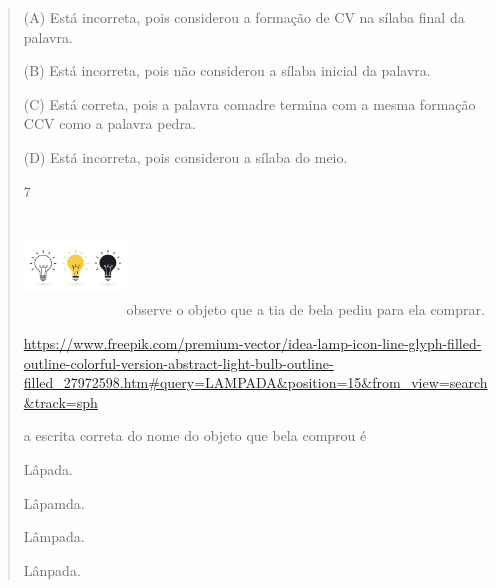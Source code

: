 \begin{verse}
{{{{(A) Está incorreta, pois considerou a formação de CV na sílaba final da
palavra.

(B) Está incorreta, pois não considerou a sílaba inicial da palavra.

(C) Está correta, pois a palavra comadre termina com a mesma formação
CCV como a palavra pedra.

(D) Está incorreta, pois considerou a sílaba do meio.

\num{7}

\includegraphics[width=1.07025in,height=1.04487in]{media/image178.jpeg}observe
o objeto que a tia de bela pediu para ela comprar.

\url{https://www.freepik.com/premium-vector/idea-lamp-icon-line-glyph-filled-outline-colorful-version-abstract-light-bulb-outline-filled_27972598.htm\#query=LAMPADA\&position=15\&from_view=search\&track=sph}

a escrita correta do nome do objeto que bela comprou é

\begin{escolha}
\item Lâpada.

\item Lâpamda.

\item Lâmpada.

\item Lânpada.
\end{escolha}

}}}}
\end{verse}
